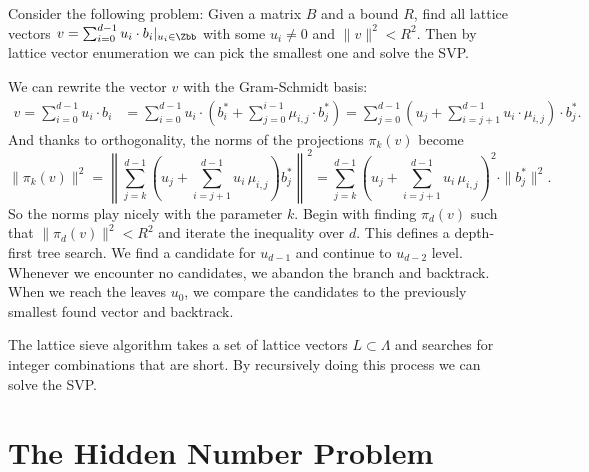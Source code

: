 \begin{definition}[Enumeration]
    Consider the following problem: Given a matrix $B$ and a bound $R$, find all lattice vectors $v = \sum_{i=0}^{d-1} u_i \cdot b_i |_{u_i \in \Zbb}$ with some $u_i \not = 0$ and $\|v\|^2 < R^2$. Then by lattice vector enumeration we can pick the smallest one and solve the SVP.

    We can rewrite the vector $v$ with the Gram-Schmidt basis:
    \begin{align*}
        v = \sum_{i=0}^{d-1} u_i \cdot b_i &= \sum_{i=0}^{d-1} u_i \cdot \left( b_i^* + \sum_{j=0}^{i-1} \mu_{i,j} \cdot b_j^* \right) = \sum_{j=0}^{d-1} \left( u_j + \sum_{i=j+1}^{d-1} u_i \cdot \mu_{i,j} \right) \cdot b_j^*.
    \end{align*}
    And thanks to orthogonality, the norms of the projections $\pi_k(v)$ become
    \begin{equation*}
        \| \pi_k(v) \|^2 = \left\| \sum_{j=k}^{d-1} \left( u_j + \sum_{i=j+1}^{d-1} u_i \, \mu_{i,j} \right) b_j^* \right\|^2 = \sum_{j=k}^{d-1} \left( u_j + \sum_{i=j+1}^{d-1} u_i \, \mu_{i,j} \right)^2 \cdot \| b_j^* \|^2.
    \end{equation*}
    So the norms play nicely with the parameter $k$. Begin with finding $\pi_d(v)$ such that $\| \pi_d(v) \|^2 < R^2$
    and iterate the inequality over $d$. This defines a depth-first tree search. We find a candidate for $u_{d-1}$ and continue to $u_{d-2}$ level. Whenever we encounter no candidates, we abandon the branch and backtrack. When we reach the leaves $u_0$, we compare the candidates to the previously smallest found vector and backtrack.
\end{definition}

\begin{definition}[Sieving]
    The lattice sieve algorithm takes a set of lattice vectors $L \subset \Lambda$ and searches for integer combinations that are short. By recursively doing this process we can solve the SVP.
\end{definition}

\begin{definition}[LLL]
    
\end{definition}
\begin{definition}[BKZ]
    
\end{definition}


\section{The Hidden Number Problem}

